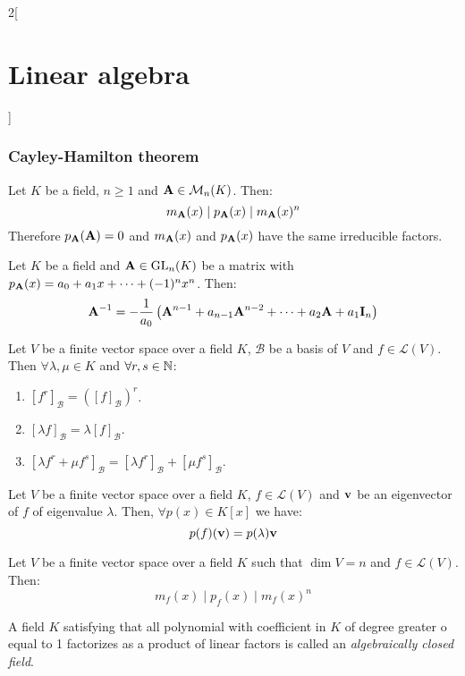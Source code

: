 \documentclass[../../../main.tex]{subfiles}
\begin{document}
\begin{multicols}{2}[\section{Linear algebra}]
  \subsubsection{Cayley-Hamilton theorem}
  \begin{theorem}
    Let $K$ be a field, $n\geq 1$ and $\boldsymbol{\mathrm{A}}\in\mathcal{M}_n(K)$. Then: $$m_{\boldsymbol{\mathrm{A}}}(x)\mid p_{\boldsymbol{\mathrm{A}}}(x)\mid m_{\boldsymbol{\mathrm{A}}}(x)^n$$ Therefore $p_{\boldsymbol{\mathrm{A}}}(\boldsymbol{\mathrm{A}})=0$ and $m_{\boldsymbol{\mathrm{A}}}(x)$ and $p_{\boldsymbol{\mathrm{A}}}(x)$ have the same irreducible factors.
  \end{theorem}
  \begin{corollary}
    Let $K$ be a field and $\boldsymbol{\mathrm{A}}\in\mathrm{GL}_n(K)$ be a matrix with $p_{\boldsymbol{\mathrm{A}}}(x)=a_0+a_1x+\cdots+(-1)^nx^n$. Then: $$\boldsymbol{\mathrm{A}}^{-1}=-\frac{1}{a_0}\left(\boldsymbol{\mathrm{A}}^{n-1}+a_{n-1}\boldsymbol{\mathrm{A}}^{n-2}+\cdots+a_2\boldsymbol{\mathrm{A}}+a_1\boldsymbol{\mathrm{I}}_n\right)$$
  \end{corollary}
  \begin{lemma}
    Let $V$ be a finite vector space over a field $K$, $\mathcal{B}$ be a basis of $V$ and $f\in\mathcal{L}(V)$. Then $\forall\lambda,\mu\in K$ and $\forall r,s\in\mathbb{N}$:
    \begin{enumerate}
      \item $[f^r]_\mathcal{B}={\left([f]_\mathcal{B}\right)}^r$.
      \item $[\lambda f]_\mathcal{B}=\lambda[f]_\mathcal{B}$.
      \item $[\lambda f^r+\mu f^s]_\mathcal{B}=[\lambda f^r]_\mathcal{B}+[\mu f^s]_\mathcal{B}$.
    \end{enumerate}
  \end{lemma}
  \begin{lemma}
    Let $V$ be a finite vector space over a field $K$, $f\in\mathcal{L}(V)$ and $\boldsymbol{\mathrm{v}}$ be an eigenvector of $f$ of eigenvalue $\lambda$. Then, $\forall p(x)\in K[x]$ we have: $$p(f)(\boldsymbol{\mathrm{v}})=p(\lambda)\boldsymbol{\mathrm{v}}$$
  \end{lemma}
  \begin{theorem}
    Let $V$ be a finite vector space over a field $K$ such that $\dim V=n$ and $f\in\mathcal{L}(V)$. Then: $$m_f(x)\mid p_f(x)\mid m_f(x)^n$$
  \end{theorem}
  \begin{definition}
    A field $K$ satisfying that all polynomial with coefficient in $K$ of degree greater o equal to 1 factorizes as a product of linear factors is called an \textit{algebraically closed field}.

\end{definition}
\end{multicols}
\end{document}
